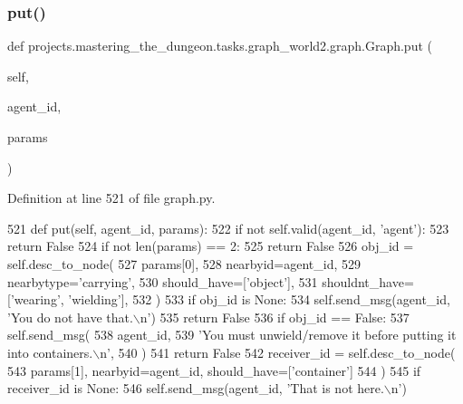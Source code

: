 \subsubsection{\texorpdfstring{put()}{put()}}
{\footnotesize\ttfamily def projects.\+mastering\+\_\+the\+\_\+dungeon.\+tasks.\+graph\+\_\+world2.\+graph.\+Graph.\+put (\begin{DoxyParamCaption}\item[{}]{self,  }\item[{}]{agent\+\_\+id,  }\item[{}]{params }\end{DoxyParamCaption})}



Definition at line 521 of file graph.\+py.


\begin{DoxyCode}
521     \textcolor{keyword}{def }put(self, agent\_id, params):
522         \textcolor{keywordflow}{if} \textcolor{keywordflow}{not} self.valid(agent\_id, \textcolor{stringliteral}{'agent'}):
523             \textcolor{keywordflow}{return} \textcolor{keyword}{False}
524         \textcolor{keywordflow}{if} \textcolor{keywordflow}{not} len(params) == 2:
525             \textcolor{keywordflow}{return} \textcolor{keyword}{False}
526         obj\_id = self.desc\_to\_node(
527             params[0],
528             nearbyid=agent\_id,
529             nearbytype=\textcolor{stringliteral}{'carrying'},
530             should\_have=[\textcolor{stringliteral}{'object'}],
531             shouldnt\_have=[\textcolor{stringliteral}{'wearing'}, \textcolor{stringliteral}{'wielding'}],
532         )
533         \textcolor{keywordflow}{if} obj\_id \textcolor{keywordflow}{is} \textcolor{keywordtype}{None}:
534             self.send\_msg(agent\_id, \textcolor{stringliteral}{'You do not have that.\(\backslash\)n'})
535             \textcolor{keywordflow}{return} \textcolor{keyword}{False}
536         \textcolor{keywordflow}{if} obj\_id == \textcolor{keyword}{False}:
537             self.send\_msg(
538                 agent\_id,
539                 \textcolor{stringliteral}{'You must unwield/remove it before putting it into containers.\(\backslash\)n'},
540             )
541             \textcolor{keywordflow}{return} \textcolor{keyword}{False}
542         receiver\_id = self.desc\_to\_node(
543             params[1], nearbyid=agent\_id, should\_have=[\textcolor{stringliteral}{'container'}]
544         )
545         \textcolor{keywordflow}{if} receiver\_id \textcolor{keywordflow}{is} \textcolor{keywordtype}{None}:
546             self.send\_msg(agent\_id, \textcolor{stringliteral}{'That is not here.\(\backslash\)n'})

\end{DoxyCode}
